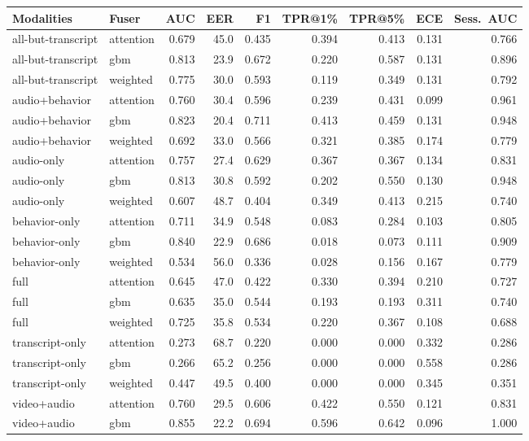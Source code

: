 \begin{tabular}{llrrrrrrr}
\toprule
Modalities & Fuser & AUC & EER & F1 & TPR@1\% & TPR@5\% & ECE & Sess.\ AUC \\
\midrule
all-but-transcript & attention & 0.679 & 45.0 & 0.435 & 0.394 & 0.413 & 0.131 & 0.766 \\
all-but-transcript & gbm & 0.813 & 23.9 & 0.672 & 0.220 & 0.587 & 0.131 & 0.896 \\
all-but-transcript & weighted & 0.775 & 30.0 & 0.593 & 0.119 & 0.349 & 0.131 & 0.792 \\
audio+behavior & attention & 0.760 & 30.4 & 0.596 & 0.239 & 0.431 & 0.099 & 0.961 \\
audio+behavior & gbm & 0.823 & 20.4 & 0.711 & 0.413 & 0.459 & 0.131 & 0.948 \\
audio+behavior & weighted & 0.692 & 33.0 & 0.566 & 0.321 & 0.385 & 0.174 & 0.779 \\
audio-only & attention & 0.757 & 27.4 & 0.629 & 0.367 & 0.367 & 0.134 & 0.831 \\
audio-only & gbm & 0.813 & 30.8 & 0.592 & 0.202 & 0.550 & 0.130 & 0.948 \\
audio-only & weighted & 0.607 & 48.7 & 0.404 & 0.349 & 0.413 & 0.215 & 0.740 \\
behavior-only & attention & 0.711 & 34.9 & 0.548 & 0.083 & 0.284 & 0.103 & 0.805 \\
behavior-only & gbm & 0.840 & 22.9 & 0.686 & 0.018 & 0.073 & 0.111 & 0.909 \\
behavior-only & weighted & 0.534 & 56.0 & 0.336 & 0.028 & 0.156 & 0.167 & 0.779 \\
full & attention & 0.645 & 47.0 & 0.422 & 0.330 & 0.394 & 0.210 & 0.727 \\
full & gbm & 0.635 & 35.0 & 0.544 & 0.193 & 0.193 & 0.311 & 0.740 \\
full & weighted & 0.725 & 35.8 & 0.534 & 0.220 & 0.367 & 0.108 & 0.688 \\
transcript-only & attention & 0.273 & 68.7 & 0.220 & 0.000 & 0.000 & 0.332 & 0.286 \\
transcript-only & gbm & 0.266 & 65.2 & 0.256 & 0.000 & 0.000 & 0.558 & 0.286 \\
transcript-only & weighted & 0.447 & 49.5 & 0.400 & 0.000 & 0.000 & 0.345 & 0.351 \\
video+audio & attention & 0.760 & 29.5 & 0.606 & 0.422 & 0.550 & 0.121 & 0.831 \\
video+audio & gbm & 0.855 & 22.2 & 0.694 & 0.596 & 0.642 & 0.096 & 1.000 \\

\end{tabular}

